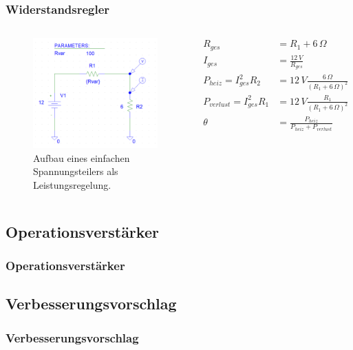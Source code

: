 \documentclass{beamer}
\begin{document}
	\begin{frame}
		\frametitle{Widerstandsregler}
		\begin{columns}
			\begin{figure}[tbh]
				\centering
				\includegraphics[width=1\linewidth]{medien/V1-0}
				\caption[Erster Aufbau]{Aufbau eines einfachen Spannungsteilers als Leistungsregelung.}
			\end{figure}
			\begin{align*}
				R_{ges}&=R_1+6\,\Omega \\
				I_{ges}&=\frac{12\, V}{R_{ges}} \\
				P_{heiz}=I_{ges}^2R_2&=12\, V\frac{6\,\Omega}{\left( R_1 + 6\,\Omega\right) ^2} \\
				P_{verlust}=I_{ges}^2R_1&=12\, V\frac{R_1}{\left( R_1 + 6\,\Omega\right) ^2} \\
				\theta &= \frac{P_{heiz}}{P_{heiz}+P_{verlust}}
			\end{align*}
		\end{columns}
	\end{frame}
	\subsection{Operationsverstärker}
	\begin{frame}
		\frametitle{Operationsverstärker}
	\end{frame}
	\subsection{Verbesserungsvorschlag}
	\begin{frame}
		\frametitle{Verbesserungsvorschlag}
	\end{frame}
\end{document}
